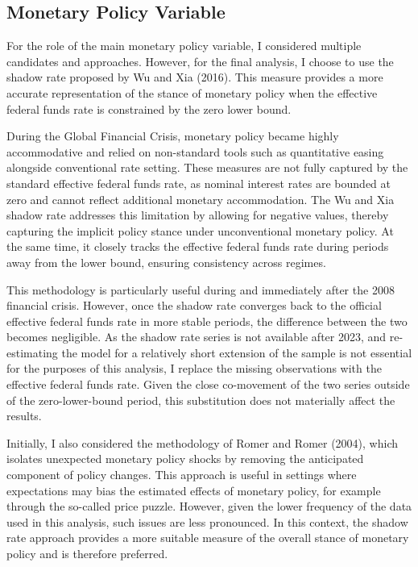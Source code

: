 \documentclass[12pt,a4paper]{report}
\begin{document}
\subsection{Monetary Policy Variable}
For the role of the main monetary policy variable, I considered multiple candidates and approaches.
However, for the final analysis, I choose to use the shadow rate proposed by Wu and Xia (2016).
This measure provides a more accurate representation of the stance of monetary policy when the
effective federal funds rate is constrained by the zero lower bound.

During the Global Financial Crisis, monetary policy became highly accommodative and relied on
non-standard tools such as quantitative easing alongside conventional rate setting. These measures
are not fully captured by the standard effective federal funds rate, as nominal interest rates are
bounded at zero and cannot reflect additional monetary accommodation. The Wu and Xia shadow rate
addresses this limitation by allowing for negative values, thereby capturing the implicit policy
stance under unconventional monetary policy. At the same time, it closely tracks the effective
federal funds rate during periods away from the lower bound, ensuring consistency across regimes.

This methodology is particularly useful during and immediately after the 2008 financial crisis.
However, once the shadow rate converges back to the official effective federal funds rate in more
stable periods, the difference between the two becomes negligible. As the shadow rate series is not
available after 2023, and re-estimating the model for a relatively short extension of the sample is
not essential for the purposes of this analysis, I replace the missing observations with the
effective federal funds rate. Given the close co-movement of the two series outside of the
zero-lower-bound period, this substitution does not materially affect the results.

Initially, I also considered the methodology of Romer and Romer (2004), which isolates unexpected
monetary policy shocks by removing the anticipated component of policy changes. This approach is
useful in settings where expectations may bias the estimated effects of monetary policy, for
example through the so-called price puzzle. However, given the lower frequency of the data used in
this analysis, such issues are less pronounced. In this context, the shadow rate approach provides a
more suitable measure of the overall stance of monetary policy and is therefore preferred.
\end{document}
